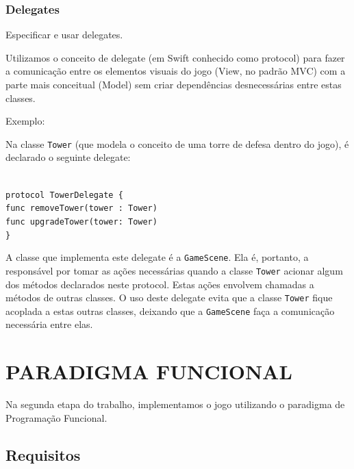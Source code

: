 \documentclass[rel_mlp]{iiufrgs}
\newcommand\tab[1][1cm]{\hspace*{#1}}
\begin{document}


\subsubsection{Delegates}

Especificar e usar delegates.

Utilizamos o conceito de delegate (em Swift conhecido como protocol) para fazer a comunicação entre os elementos visuais do jogo (View, no padrão MVC) com a parte mais conceitual (Model) sem criar dependências desnecessárias entre estas classes.

Exemplo:

Na classe \texttt{Tower} (que modela o conceito de uma torre de defesa dentro do jogo), é declarado o seguinte delegate:

\texttt{\\ protocol TowerDelegate \{\\\tab func removeTower(tower : Tower)\\\tab func upgradeTower(tower: Tower)\\\}}

A classe que implementa este delegate é a \texttt{GameScene}. Ela é, portanto, a responsável por tomar as ações necessárias quando a classe \texttt{Tower} acionar algum dos métodos declarados neste protocol. Estas ações envolvem chamadas a métodos de outras classes. O uso deste delegate evita que a classe \texttt{Tower} fique acoplada a estas outras classes, deixando que a \texttt{GameScene} faça a comunicação necessária entre elas.

%
\section{PARADIGMA FUNCIONAL}

Na segunda etapa do trabalho, implementamos o jogo utilizando o paradigma de Programação Funcional.


\subsection{Requisitos}
\end{document}
